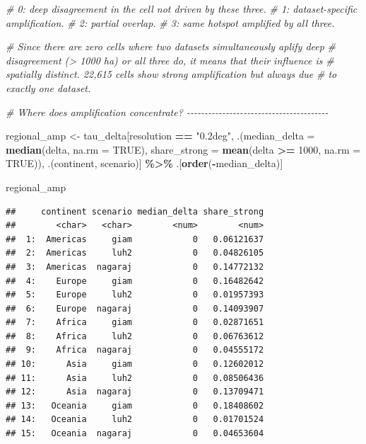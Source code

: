 \documentclass[
  11pt,
]{article}
\newenvironment{Shaded}{\begin{snugshade}}{\end{snugshade}}
\newcommand{\AttributeTok}[1]{\textcolor[rgb]{0.13,0.29,0.53}{#1}}
\newcommand{\CommentTok}[1]{\textcolor[rgb]{0.56,0.35,0.01}{\textit{#1}}}
\newcommand{\ConstantTok}[1]{\textcolor[rgb]{0.56,0.35,0.01}{#1}}
\newcommand{\DecValTok}[1]{\textcolor[rgb]{0.00,0.00,0.81}{#1}}
\newcommand{\FunctionTok}[1]{\textcolor[rgb]{0.13,0.29,0.53}{\textbf{#1}}}
\newcommand{\NormalTok}[1]{#1}
\newcommand{\OtherTok}[1]{\textcolor[rgb]{0.56,0.35,0.01}{#1}}
\newcommand{\SpecialCharTok}[1]{\textcolor[rgb]{0.81,0.36,0.00}{\textbf{#1}}}
\newcommand{\StringTok}[1]{\textcolor[rgb]{0.31,0.60,0.02}{#1}}
\begin{document}
\begin{Shaded}
\begin{Highlighting}[]
\CommentTok{\# 0: deep disagreement in the cell not driven by these three.}
\CommentTok{\# 1: dataset{-}specific amplification.}
\CommentTok{\# 2: partial overlap.}
\CommentTok{\# 3: same hotspot amplified by all three.}

\CommentTok{\# Since there are zero cells where two datasets simultaneously aplify deep}
\CommentTok{\# disagreement (\textgreater{} 1000 ha) or all three do, it means that their influence is}
\CommentTok{\# spatially distinct. 22,615 cells show strong amplification but always due}
\CommentTok{\# to exactly one dataset.}

\CommentTok{\# Where does amplification concentrate? {-}{-}{-}{-}{-}{-}{-}{-}{-}{-}{-}{-}{-}{-}{-}{-}{-}{-}{-}{-}{-}{-}{-}{-}{-}{-}{-}{-}{-}{-}{-}{-}{-}{-}{-}{-}{-}{-}{-}{-}}

\NormalTok{regional\_amp }\OtherTok{\textless{}{-}}\NormalTok{ tau\_delta[resolution }\SpecialCharTok{==} \StringTok{"0.2deg"}\NormalTok{,}
\NormalTok{                          .(}\AttributeTok{median\_delta =} \FunctionTok{median}\NormalTok{(delta, }\AttributeTok{na.rm =} \ConstantTok{TRUE}\NormalTok{),}
                            \AttributeTok{share\_strong =} \FunctionTok{mean}\NormalTok{(delta }\SpecialCharTok{\textgreater{}=} \DecValTok{1000}\NormalTok{, }\AttributeTok{na.rm =} \ConstantTok{TRUE}\NormalTok{)),}
\NormalTok{                          .(continent, scenario)] }\SpecialCharTok{\%\textgreater{}\%}
\NormalTok{  .[}\FunctionTok{order}\NormalTok{(}\SpecialCharTok{{-}}\NormalTok{median\_delta)]}


\NormalTok{regional\_amp}
\end{Highlighting}
\end{Shaded}

\begin{verbatim}
##     continent scenario median_delta share_strong
##        <char>   <char>        <num>        <num>
##  1:  Americas     giam            0   0.06121637
##  2:  Americas     luh2            0   0.04826105
##  3:  Americas  nagaraj            0   0.14772132
##  4:    Europe     giam            0   0.16482642
##  5:    Europe     luh2            0   0.01957393
##  6:    Europe  nagaraj            0   0.14093907
##  7:    Africa     giam            0   0.02871651
##  8:    Africa     luh2            0   0.06763612
##  9:    Africa  nagaraj            0   0.04555172
## 10:      Asia     giam            0   0.12602012
## 11:      Asia     luh2            0   0.08506436
## 12:      Asia  nagaraj            0   0.13709471
## 13:   Oceania     giam            0   0.18408602
## 14:   Oceania     luh2            0   0.01701524
## 15:   Oceania  nagaraj            0   0.04653604
\end{verbatim}
\end{document}

